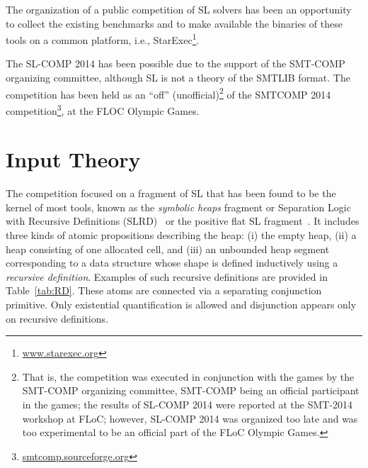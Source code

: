 \documentclass{llncs}
\begin{document}
The organization of a public competition of SL solvers has been an opportunity 
to collect the existing benchmarks and  
to make available the binaries of these tools on a common platform, i.e., StarExec\footnote{\url{www.starexec.org}}.

The SL-COMP 2014 has been possible due to the support of the SMT-COMP organizing committee, 
although SL is not a theory of the SMTLIB format.
The competition has been held as an ``off'' (unofficial)\footnote{That is, the competition was executed in conjunction with the games by the SMT-COMP organizing committee, SMT-COMP being an official participant in the games; the results of SL-COMP 2014 were reported at the SMT-2014 workshop at FLoC; however, SL-COMP 2014 was organized too late and was too experimental to be an official part of the FLoC Olympic Games.}
of the SMTCOMP 2014 competition\footnote{\url{smtcomp.sourceforge.org}}, at the FLOC Olympic Games.


\section{Input Theory}

The competition focused on a fragment of SL that has been found to be the kernel of most tools, known 
as
the \emph{symbolic heaps} fragment
or Separation Logic with Recursive Definitions (SLRD)~\cite{IosifRS13} or
the positive flat SL fragment~\cite{AntonopoulosGHKO14}. 
It includes three kinds of atomic propositions describing the heap:
(i) the empty heap, 
(ii) a heap consisting of one allocated cell, and
(iii) an unbounded heap segment corresponding to a data structure whose shape is defined inductively using a \emph{recursive definition}. 
Examples of such recursive definitions are provided in Table~\ref{tab:RD}.
These atoms are connected via a separating conjunction primitive. 
Only existential quantification is allowed and 
disjunction appears only on recursive definitions. 

\end{document}
